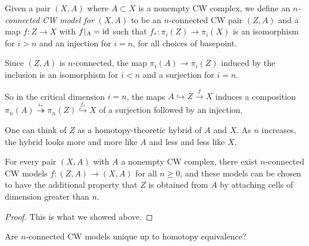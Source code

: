 \begin{definition}
    Given a pair $(X,A)$ where $A \subset X$ is a
    nonempty CW complex, we
    define an \textit{$n$-connected CW model for}
    $(X,A)$ to be an $n$-connected CW pair
    $(Z,A)$ and a map $f \colon Z \to X$ with
    $f |_{A} = {\mathrm{id}}$ such that
    $f_* \colon \pi_i (Z) \to \pi_i(X)$ is an isomorphism
    for $i>n$ and an injection for $i = n$, for all
    choices of basepoint.
\end{definition}

Since $(Z,A)$ is $n$-connected, the map
$\pi_i(A) \to \pi_i(Z)$ induced by the inclusion
is an isomorphism for $i< n$ and a surjection
for $i = n$. 

So in the critical dimension $i =n$, the maps
$A \hookrightarrow Z \stackrel{f}{\to} X$ induces
a composition
$\pi_n (A) \stackrel{\iota_*}{\twoheadrightarrow} \pi_n(Z)
\stackrel{f_*}{\hookrightarrow} X$ of a surjection followed
by an injection.\\
\linebreak
\begin{remark}[]
    One can think of $Z$ as a homotopy-theoretic
    hybrid of $A$ and $X$. As
    $n$ increases, the hybrid looks more and more like
    $A$ and less and less like $X$.
\end{remark}

\begin{proposition}[]\label{Prop:4-15}
    For every pair $(X,A)$ with $A$ a nonempty
    CW complex, there exist  $n$-connected 
    CW models  $f \colon (Z,A) \to (X,A)$ for all
    $n\ge 0$, and these models can be
    chosen to have the additional property that $Z$ is obtained
    from $A$ by attaching cells of dimension greater than
    $n$.
\end{proposition}

\begin{proof}
    This is what we showed above.
\end{proof}

\begin{question}
    Are $n$-connected CW models unique up to homotopy equivalence?
\end{question}

